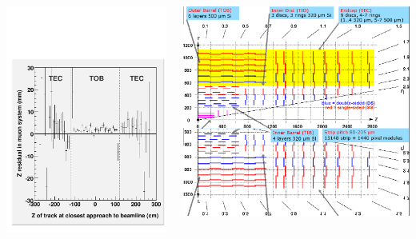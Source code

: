 \documentclass[compress]{beamer}
\begin{document}
\begin{frame}
\begin{columns}
\includegraphics[width=\linewidth]{zresid_from_tracker_outertop.pdf}

\includegraphics[width=\linewidth]{tracker_map_outertop.png}
\end{columns}
\end{frame}
\end{document}
